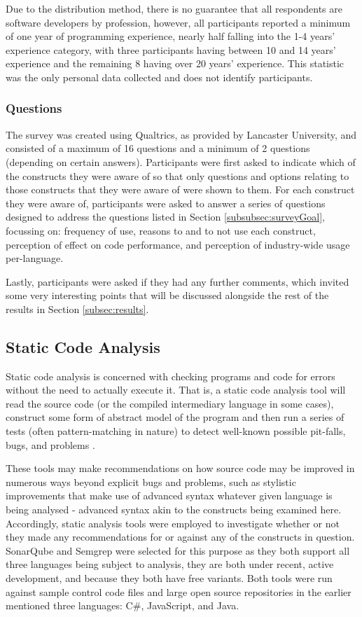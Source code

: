 \documentclass{article}
\begin{document}
            Due to the distribution method, there is no guarantee that all respondents are software developers by profession, however, all participants reported a minimum of one year of programming experience, nearly half falling into the 1-4 years' experience category, with three participants having between 10 and 14 years' experience and the remaining 8 having over 20 years' experience. This statistic was the only personal data collected and does not identify participants.
        \subsubsection{Questions}
            The survey was created using Qualtrics, as provided by Lancaster University, and consisted of a maximum of 16 questions and a minimum of 2 questions (depending on certain answers).
            Participants were first asked to indicate which of the constructs they were aware of so that only questions and options relating to those constructs that they were aware of were shown to them. For each construct they were aware of, participants were asked to answer a series of questions designed to address the questions listed in Section \ref{subsubsec:surveyGoal}, focussing on: frequency of use, reasons to and to not use each construct, perception of effect on code performance, and perception of industry-wide usage per-language.
            
            Lastly, participants were asked if they had any further comments, which invited some very interesting points that will be discussed alongside the rest of the results in Section \ref{subsec:results}.
    \subsection{Static Code Analysis}
        Static code analysis is concerned with checking programs and code for errors without the need to actually execute it. That is, a static code analysis tool will read the source code (or the compiled intermediary language in some cases), construct some form of abstract model of the program and then run a series of tests (often pattern-matching in nature) to detect well-known possible pit-falls, bugs, and problems \citep{staticCodeAnalysis}.

        These tools may make recommendations on how source code may be improved in numerous ways beyond explicit bugs and problems, such as stylistic improvements that make use of advanced syntax whatever given language is being analysed - advanced syntax akin to the constructs being examined here. Accordingly, static analysis tools were employed to investigate whether or not they made any recommendations for or against any of the constructs in question. SonarQube and Semgrep were selected for this purpose as they both support all three languages being subject to analysis, they are both under recent, active development, and because they both have free variants. Both tools were run against sample control code files and large open source repositories in the earlier mentioned three languages: C\#, JavaScript, and Java.
            
\end{document}

